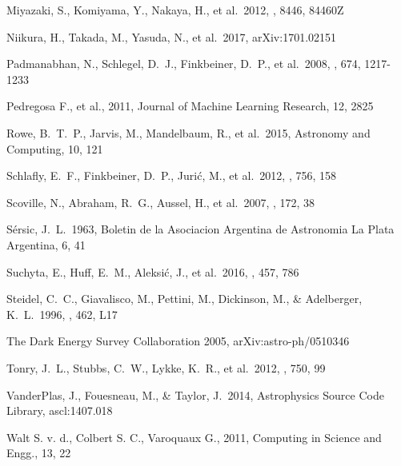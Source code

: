 \documentclass[useamsfonts]{pasj01}
\begin{document}
\begin{thebibliography}{}
     Miyazaki, S., Komiyama, Y., Nakaya,
             H., et al.\ 2012, \procspie, 8446, 84460Z

     Niikura, H., Takada, M., Yasuda, N.,
             et al.\ 2017, arXiv:1701.02151

     Padmanabhan, N., Schlegel,
             D.~J., Finkbeiner, D.~P., et al.\ 2008, \apj, 674, 1217-1233

     Pedregosa F., et al., 2011,
             Journal of Machine Learning Research, 12, 2825

     Rowe, B.~T.~P., Jarvis, M., Mandelbaum, R.,
             et al.\ 2015, Astronomy and Computing, 10, 121

     Schlafly, E.~F., Finkbeiner, D.~P.,
             Juri{\'c}, M., et al.\ 2012, \apj, 756, 158

     Scoville, N., Abraham, R.~G.,
             Aussel, H., et al.\ 2007, \apjs, 172, 38

     S{\'e}rsic, J.~L.\ 1963, Boletin de la
             Asociacion Argentina de Astronomia La Plata Argentina, 6, 41

     Suchyta, E., Huff, E.~M., Aleksi{\'c},
             J., et al.\ 2016, \mnras, 457, 786

     Steidel, C.~C., Giavalisco, M.,
             Pettini, M., Dickinson, M., \& Adelberger, K.~L.\ 1996, \apjl, 462, L17

     The Dark Energy
             Survey Collaboration 2005, arXiv:astro-ph/0510346

     Tonry, J.~L., Stubbs, C.~W., Lykke, K.~R.,
             et al.\ 2012, \apj, 750, 99

     VanderPlas, J., Fouesneau, M., \&
             Taylor, J.\ 2014, Astrophysics Source Code Library, ascl:1407.018

     Walt S. v. d., Colbert S. C., Varoquaux G.,
             2011, Computing in Science and Engg., 13, 22

\end{thebibliography}
\end{document}
